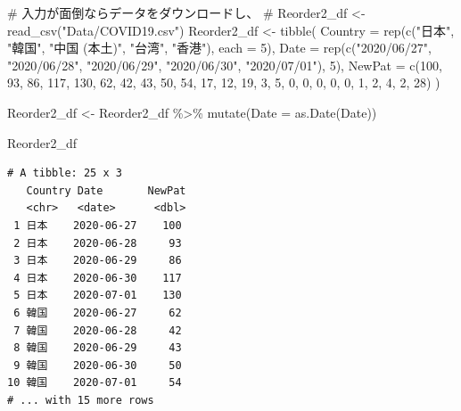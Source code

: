 \documentclass[
  a4paper,
  pandoc,
  ja=standard,
  jafont=haranoaji]{bxjsbook}
\newenvironment{Shaded}{\begin{snugshade}}{\end{snugshade}}
\newcommand{\AttributeTok}[1]{\textcolor[rgb]{0.00,0.48,0.65}{#1}}
\newcommand{\CommentTok}[1]{\textcolor[rgb]{0.37,0.37,0.37}{#1}}
\newcommand{\DecValTok}[1]{\textcolor[rgb]{0.68,0.00,0.00}{#1}}
\newcommand{\FunctionTok}[1]{\textcolor[rgb]{0.28,0.35,0.67}{#1}}
\newcommand{\NormalTok}[1]{\textcolor[rgb]{0.00,0.48,0.65}{#1}}
\newcommand{\OtherTok}[1]{\textcolor[rgb]{0.00,0.48,0.65}{#1}}
\newcommand{\SpecialCharTok}[1]{\textcolor[rgb]{0.37,0.37,0.37}{#1}}
\newcommand{\StringTok}[1]{\textcolor[rgb]{0.13,0.47,0.30}{#1}}
\begin{document}
\begin{Shaded}
\begin{Highlighting}[numbers=left,,]
\CommentTok{\# 入力が面倒ならデータをダウンロードし、}
\CommentTok{\# Reorder2\_df \textless{}{-} read\_csv("Data/COVID19.csv")}
\NormalTok{Reorder2\_df }\OtherTok{\textless{}{-}} \FunctionTok{tibble}\NormalTok{(}
  \AttributeTok{Country =} \FunctionTok{rep}\NormalTok{(}\FunctionTok{c}\NormalTok{(}\StringTok{"日本"}\NormalTok{, }\StringTok{"韓国"}\NormalTok{, }\StringTok{"中国 (本土)"}\NormalTok{, }\StringTok{"台湾"}\NormalTok{, }\StringTok{"香港"}\NormalTok{),}
                \AttributeTok{each =} \DecValTok{5}\NormalTok{),}
  \AttributeTok{Date    =} \FunctionTok{rep}\NormalTok{(}\FunctionTok{c}\NormalTok{(}\StringTok{"2020/06/27"}\NormalTok{, }\StringTok{"2020/06/28"}\NormalTok{, }\StringTok{"2020/06/29"}\NormalTok{,}
                  \StringTok{"2020/06/30"}\NormalTok{, }\StringTok{"2020/07/01"}\NormalTok{), }\DecValTok{5}\NormalTok{),}
  \AttributeTok{NewPat  =} \FunctionTok{c}\NormalTok{(}\DecValTok{100}\NormalTok{, }\DecValTok{93}\NormalTok{, }\DecValTok{86}\NormalTok{, }\DecValTok{117}\NormalTok{, }\DecValTok{130}\NormalTok{, }
               \DecValTok{62}\NormalTok{, }\DecValTok{42}\NormalTok{, }\DecValTok{43}\NormalTok{,  }\DecValTok{50}\NormalTok{,  }\DecValTok{54}\NormalTok{,}
               \DecValTok{17}\NormalTok{, }\DecValTok{12}\NormalTok{, }\DecValTok{19}\NormalTok{,   }\DecValTok{3}\NormalTok{,   }\DecValTok{5}\NormalTok{,}
                \DecValTok{0}\NormalTok{,  }\DecValTok{0}\NormalTok{,  }\DecValTok{0}\NormalTok{,   }\DecValTok{0}\NormalTok{,   }\DecValTok{0}\NormalTok{,}
                \DecValTok{1}\NormalTok{,  }\DecValTok{2}\NormalTok{,  }\DecValTok{4}\NormalTok{,   }\DecValTok{2}\NormalTok{,  }\DecValTok{28}\NormalTok{)}
\NormalTok{)}

\NormalTok{Reorder2\_df }\OtherTok{\textless{}{-}}\NormalTok{ Reorder2\_df }\SpecialCharTok{\%\textgreater{}\%}
  \FunctionTok{mutate}\NormalTok{(}\AttributeTok{Date =} \FunctionTok{as.Date}\NormalTok{(Date))}

\NormalTok{Reorder2\_df}
\end{Highlighting}
\end{Shaded}

\begin{verbatim}
# A tibble: 25 x 3
   Country Date       NewPat
   <chr>   <date>      <dbl>
 1 日本    2020-06-27    100
 2 日本    2020-06-28     93
 3 日本    2020-06-29     86
 4 日本    2020-06-30    117
 5 日本    2020-07-01    130
 6 韓国    2020-06-27     62
 7 韓国    2020-06-28     42
 8 韓国    2020-06-29     43
 9 韓国    2020-06-30     50
10 韓国    2020-07-01     54
# ... with 15 more rows
\end{verbatim}
\end{document}

